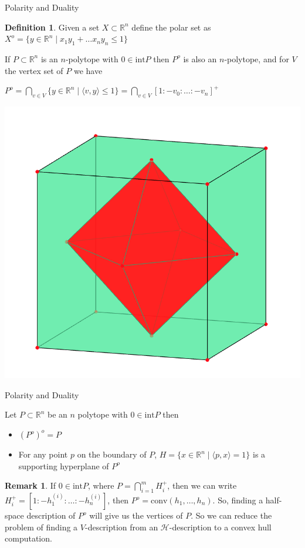 \documentclass[9pt]{beamer}
\newcommand\R{\mathbb{R}}
\newcommand\set[1]{\{#1\}}
\theoremstyle{definition}
\newtheorem{remark}{Remark}
\newtheorem{defn}{Definition}
\begin{document}
\begin{frame}[fragile]{Polarity and Duality}
  \begin{defn}
    Given a set $X \subset \mathbb{R}^n$ define the polar set as
    $X^o = \{y \in \mathbb{R}^n \mid x_1y_1 + \dots x_ny_n \leq 1\}$
  \end{defn}
  \begin{theorem}
    If $P \subset \mathbb{R}^n$ is an $n$-polytope with $0 \in \text{int}P$ then
    $P^o$ is also an $n$-polytope, and for $V$ the vertex set of $P$ we have
    \begin{center}
      $P^o = \bigcap_{v \in V} \set{y \in \R^n \mid \langle v, y \rangle \leq 1} = \bigcap_{v \in V} [1: -v_0: \dots : -v_n]^+$
    \end{center}
  \end{theorem}
  \begin{center}
    \includegraphics[width=.30\textwidth, height=0.4\textheight]{images/polar}
  \end{center}
\end{frame}

\begin{frame}[fragile]{Polarity and Duality}
  \begin{theorem}
    Let $P \subset \R^n$ be an $n$ polytope with $0 \in \text{int}P$ then
    \begin{itemize}
    \item $(P^o)^o = P$
    \item For any point $p$ on the boundary of $P$, $H = \set{x \in \R^n
      \mid \langle p, x \rangle = 1}$ is a supporting hyperplane of $P^o$
    \end{itemize}
  \end{theorem}
  \begin{remark}
    If $0 \in \text{int} P$, where $P = \bigcap_{i=1}^m H_i^+$, then we can write
    $H_i^+ = [1:-h_1^{(i)}: \dots: -h_n^{(i)}]$, then $P^o = \text{conv}(h_1, \dots, h_n)$.
    So, finding a half-space description of $P^o$ will give us the vertices of $P$.
    So we can reduce the problem of finding a $V$-description from an $\mathcal{H}$-description
    to a convex hull computation. 
  \end{remark}
  
\end{frame}
\end{document}
